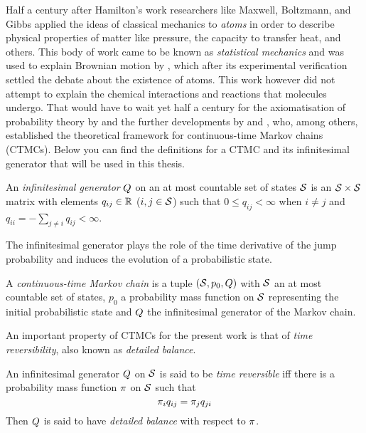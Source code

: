 Half a century after Hamilton's work
researchers like Maxwell, Boltzmann, and Gibbs %
applied the ideas of classical mechanics to \emph{atoms}
in order to describe physical properties of matter like pressure,
the capacity to transfer heat, and others.
This body of work came to be known as \emph{statistical mechanics}
and was used to explain Brownian motion by \citet{einstein-brownian},
which after its experimental verification \citep{perrin}
settled the debate about the existence of atoms.
This work however did not attempt to explain
the chemical interactions and reactions that molecules undergo.
That would have to wait yet half a century
for the axiomatisation of probability theory by \citet{kolmogorov}
and the further developments by \citet{doob} and \citet{feller},
who, among others, established the theoretical framework
for continuous-time Markov chains (CTMCs).
Below you can find the definitions for a CTMC
and its infinitesimal generator that will be used in this thesis.

\begin{definition}
  An \emph{infinitesimal generator} $Q$
  on an at most countable set of states $\mathcal{S}$
  is an $\mathcal{S} \times \mathcal{S}$ matrix
  with elements $q_{ij} \in \mathbb{R}$ ($i,j \in \mathcal{S}$)
  such that $0 \leqslant q_{ij} < \infty$ when $i \neq j$
  and $q_{ii} = - \sum_{j \neq i} q_{ij} < \infty$.
\end{definition}

The infinitesimal generator plays the role of
the time derivative of the jump probability and
induces the evolution of a probabilistic state.

\begin{definition}[CTMC]%
  A \emph{continuous-time Markov chain} is a tuple
  $\left(\mathcal{S}, p_0, Q\right)$ with
  $\mathcal{S}$ an at most countable set of states,
  $p_0$ a probability mass function on $\mathcal{S}$
  representing the initial probabilistic state and
  $Q$ the infinitesimal generator of the Markov chain.
\end{definition}

An important property of CTMCs for the present work is that of
\emph{time reversibility}, also known as \emph{detailed balance}.

\begin{definition}
  An infinitesimal generator $Q$ on $\mathcal{S}$
  is said to be \emph{time reversible} iff
  there is a probability mass function $\pi$ on $\mathcal{S}$ such that
  \begin{equation}
    \label{eq:detailed-balance}
    \pi_i q_{ij} = \pi_j q_{ji}
  \end{equation}
  Then $Q$ is said to have \emph{detailed balance}
  with respect to $\pi$.
\end{definition}

